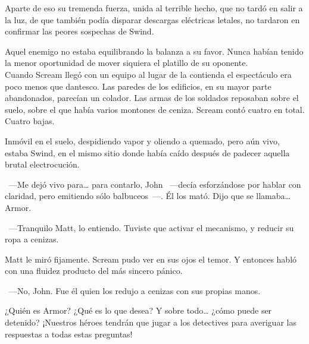 Aparte de eso su tremenda fuerza, unida al terrible hecho, que no tardó en salir a la luz, de que también podía disparar descargas eléctricas letales, no tardaron en confirmar las peores sospechas de Swind.

Aquel enemigo no estaba equilibrando la balanza a su favor. Nunca habían tenido la menor oportunidad de mover siquiera el platillo de su oponente.\\

\noindent{}Cuando Scream llegó con un equipo al lugar de la contienda el espectáculo era poco menos que dantesco. Las paredes de los edificios, en su mayor parte abandonados, parecían un colador. Las armas de los soldados reposaban sobre el suelo, sobre el que había varios montones de ceniza. Scream contó cuatro en total. Cuatro bajas.

Inmóvil en el suelo, despidiendo vapor y oliendo a quemado, pero aún vivo, estaba Swind, en el mismo sitio donde había caído después de padecer aquella brutal electrocución.

~---Me dejó vivo para\dots{} para contarlo, John ~---decía esforzándose por hablar con claridad, pero emitiendo sólo balbuceos~---. Él los mató. Dijo que se llamaba\dots{} Armor.

~---Tranquilo Matt, lo entiendo. Tuviste que activar el mecanismo, y reducir su ropa a cenizas.

Matt le miró fijamente. Scream pudo ver en sus ojos el temor. Y entonces habló con una fluidez producto del más sincero pánico.

~---No, John. Fue él quien los redujo a cenizas con sus propias manos.

\begin{next}
    ¿Quién es Armor? ¿Qué es lo que desea? Y sobre todo\dots{} ¿cómo puede ser detenido? ¡Nuestros héroes tendrán que jugar a los detectives para averiguar las respuestas a todas estas preguntas!
\end{next}

\endinput
